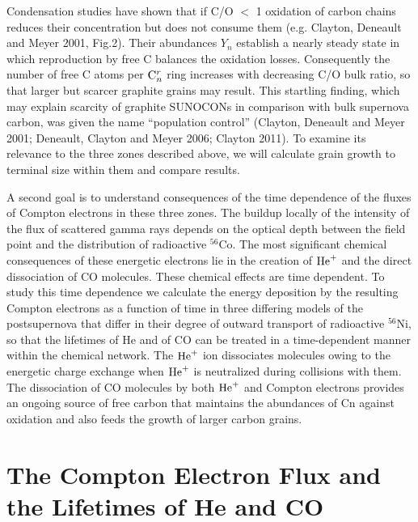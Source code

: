 \documentclass[manuscript]{aastex}
\newcommand{\cnr}{{\rm C}_n^r}
\newcommand{\hep}{{\rm He}^+}
\begin{document}
Condensation studies have shown that if C/O $<$ 1 oxidation of carbon chains 
reduces their concentration but does not consume them 
(e.g. Clayton, Deneault and Meyer 2001, Fig.2). 
Their abundances $Y_n$ establish a nearly steady state in which reproduction 
by free C balances the oxidation losses. Consequently the number of free 
C atoms per $\cnr$ ring increases with decreasing C/O bulk ratio, so that 
larger but scarcer graphite grains may result. This startling finding, 
which may explain scarcity of graphite SUNOCONs in comparison with 
bulk supernova carbon, was given the name “population control” 
(Clayton, Deneault and Meyer 2001; Deneault, Clayton and Meyer 2006; 
Clayton 2011). 
To examine its relevance to the three zones described above, we will 
calculate grain growth to terminal size within them and compare results. 

A second goal is to understand consequences of the time dependence of the 
fluxes of Compton electrons in these three zones. The buildup locally of 
the intensity of the flux of scattered gamma rays depends on the optical 
depth between the field point and the distribution of radioactive $^{56}$Co. 
The most significant chemical consequences of these energetic electrons lie 
in the creation of $\hep$ and the direct dissociation of CO molecules. These 
chemical effects are time dependent. To study this time dependence we 
calculate the energy deposition by the resulting Compton electrons as a 
function of time in three differing models of the postsupernova that 
differ in their degree of outward transport of radioactive $^{56}$Ni, so 
that the lifetimes of He and of CO can be treated in a time-dependent 
manner within the chemical network. The $\hep$ ion dissociates molecules 
owing to the energetic charge exchange when $\hep$ is neutralized during 
collisions with them. The dissociation of CO molecules by both $\hep$ and 
Compton electrons provides an ongoing source of free carbon that maintains 
the abundances of Cn against oxidation and also feeds the growth of 
larger carbon grains.

\section{The Compton Electron Flux and the Lifetimes of He and CO}
\end{document}
